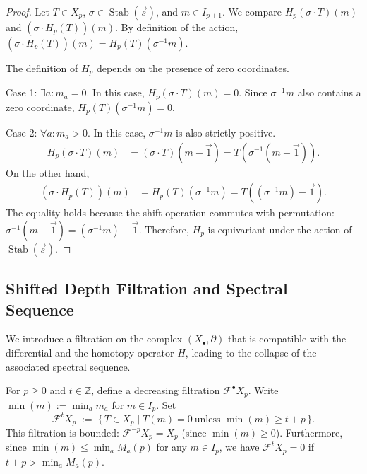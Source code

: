 \begin{proof}
Let $T\in X_p$, $\sigma\in \operatorname{Stab}(\vec{s})$, and $m\in I_{p+1}$. We compare $H_p(\sigma\cdot T)(m)$ and $(\sigma\cdot H_p(T))(m)$. By definition of the action, $(\sigma\cdot H_p(T))(m) = H_p(T)(\sigma^{-1}m)$.

The definition of $H_p$ depends on the presence of zero coordinates. 

Case 1: $\exists a: m_a = 0$.
In this case, $H_p(\sigma\cdot T)(m) = 0$. Since $\sigma^{-1}m$ also contains a zero coordinate, $H_p(T)(\sigma^{-1}m) = 0$.

Case 2: $\forall a: m_a > 0$.
In this case, $\sigma^{-1}m$ is also strictly positive.
\begin{align*} H_p(\sigma\cdot T)(m) &= (\sigma\cdot T)(m-\vec{1}) = T(\sigma^{-1}(m-\vec{1})). \end{align*}
On the other hand,
\begin{align*} (\sigma\cdot H_p(T))(m) &= H_p(T)(\sigma^{-1}m) = T((\sigma^{-1}m)-\vec{1}). \end{align*}
The equality holds because the shift operation commutes with permutation: $\sigma^{-1}(m-\vec{1}) = (\sigma^{-1}m)-\vec{1}$.
Therefore, $H_p$ is equivariant under the action of $\operatorname{Stab}(\vec{s})$.
\end{proof}



\subsection{Shifted Depth Filtration and Spectral Sequence}

We introduce a filtration on the complex $(X_\bullet, \partial)$ that is compatible with the differential 
and the homotopy operator $H$, leading to the collapse of the associated spectral sequence.


\begin{definition}\label{def:shifted_depthF}
For $p\ge 0$ and $t\in\mathbb{Z}$, define a decreasing filtration $\mathcal{F}^\bullet X_p$.
Write $\min(m):=\min_a m_a$ for $m\in I_p$. Set
\[
\mathcal{F}^t X_p\;:=\;\{\,T\in X_p\mid T(m)=0\ \text{unless }\min(m)\ge t+p\,\}.
\]
This filtration is bounded: $\mathcal{F}^{-p}X_p=X_p$ (since $\min(m) \ge 0$). 
Furthermore, since $\min(m) \le \min_a M_a(p)$ for any $m\in I_p$, we have $\mathcal{F}^t X_p=0$ if $t+p > \min_a M_a(p)$.
\end{definition}



